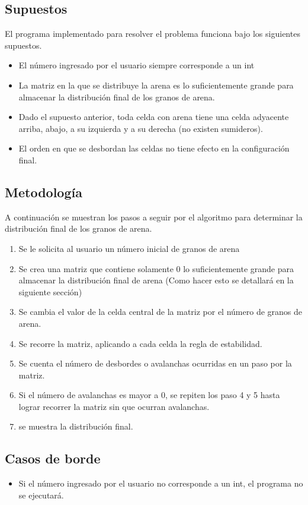 \documentclass[letterpaper,11pt]{article} %
\begin{document}
\subsection{Supuestos}
El programa implementado para resolver el problema funciona bajo los siguientes supuestos.
\begin{itemize}
\item El número ingresado por el usuario siempre corresponde a un int
\item La matriz en la que se distribuye la arena es lo suficientemente grande para almacenar la distribución final de los granos de arena.
\item Dado el supuesto anterior, toda celda con arena tiene una celda adyacente arriba, abajo, a su izquierda y a su derecha (no existen sumideros).
\item El orden en que se desbordan las celdas no tiene efecto en la configuración final.
\end{itemize}
\subsection{Metodología}
A continuación se muestran los pasos a seguir por el algoritmo para determinar la distribución final de los granos de arena.
\begin{enumerate}
\item Se le solicita al usuario un número inicial de granos de arena
\item Se crea una matriz que contiene solamente 0 lo suficientemente grande para almacenar la distribución final de arena (Como hacer esto se detallará en la siguiente sección)
\item Se cambia el valor de la celda central de la matriz por el número de granos de arena.
\item Se recorre la matriz, aplicando a cada celda la regla de estabilidad.
\item Se cuenta el número de desbordes o avalanchas ocurridas en un paso por la matriz.
\item Si el número de avalanchas es mayor a 0, se repiten los paso 4 y 5 hasta lograr recorrer la matriz sin que ocurran avalanchas.
\item se muestra la distribución final.
\end{enumerate}

\subsection{Casos de borde}
\begin{itemize}
    \item Si el número ingresado por el usuario no corresponde a un int, el programa no se ejecutará.
\end{itemize}
\end{document}
